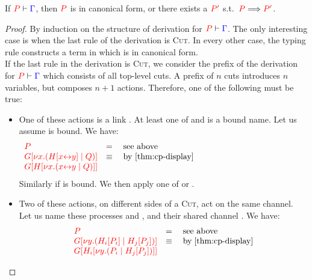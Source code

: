 \begin{theorem}[Progress]\label{thm:cp-progress}
  If $\seq[{ P }]{ \Gamma }$, then $\tm{P}$ is in canonical form, or there
  exists a $\tm{P'}$ s.t.\ $\reducesto{P}{P'}$. 
\end{theorem}
\begin{proof}
  By induction on the structure of derivation for $\seq[{ P }]{ \Gamma }$.
  The only interesting case is when the last rule of the derivation is
  \textsc{Cut}. In every other case, the typing rule constructs a term in which
  is in canonical form. 
  \\
  If the last rule in the derivation is \textsc{Cut}, we consider the prefix of
  the derivation for $\seq[{ P }]{ \Gamma}$ which consists of all top-level
  cuts. A prefix of $n$ cuts introduces $n$ variables, but composes $n+1$
  actions. Therefore, one of the following must be true: 
  \begin{itemize}
  \item
    One of these actions is a link . At least one of 
    and  is a bound name. Let us assume  is bound. We have:
    \begin{gather*}
      \begin{array}{ll}
        \tm{P}
        & = \quad \text{see above}
        \\
        \tm{\cpPlug{G}{\cpCut{x}{\cpPlug{H}{\cpLink{x}{y}}}{Q}}}
        & \equiv \quad \text{by \cref{thm:cp-display}}
          \hphantom{\; \text{and} \; \cref{thm:cp-preservation-equiv}}
        \\
        \tm{\cpPlug{G}{\cpPlug{H}{\cpCut{x}{\cpLink{x}{y}}{Q}}}}
      \end{array}
    \end{gather*}
    Similarly if  is bound. We then apply one of  or
    .
  \item
    Two of these actions, on different sides of a \textsc{Cut}, act on the same
    channel. 
    \\
    Let us name these processes  and , and their shared channel
    . We have:
    \begin{gather*}
      \begin{array}{ll}
        \tm{P}
        & = \quad \text{see above}
        \\
        \tm{\cpPlug{G}{\cpCut{y}{\cpPlug{H_i}{P_i}}{\cpPlug{H_j}{P_j}}}}
        & \equiv \quad \text{by} \; \cref{thm:cp-display}
        \\
        \tm{\cpPlug{G}{\cpPlug{H_i}{\cpCut{y}{P_i}{\cpPlug{H_j}{P_j}}}}}

\end{array}
\end{gather*}
\end{itemize}
\end{proof}

